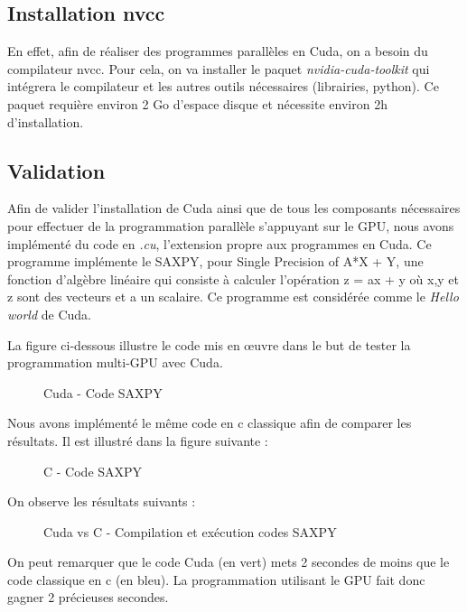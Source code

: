 \documentclass[final]{polytech/polytech}
\begin{document}
\subsection{Installation nvcc}
En effet, afin de réaliser des programmes parallèles en Cuda, on a besoin du compilateur nvcc. Pour cela, on va installer le paquet \textit{nvidia-cuda-toolkit} qui intégrera le compilateur et les autres outils nécessaires (librairies, python). Ce paquet requière environ 2 Go d'espace disque et nécessite environ 2h d'installation.

\subsection{Validation}
Afin de valider l'installation de Cuda ainsi que de tous les composants nécessaires pour effectuer de la programmation parallèle s'appuyant sur le GPU, nous avons implémenté du code en \textit{.cu}, l'extension propre aux programmes en Cuda. Ce programme implémente le SAXPY, pour Single Precision of A*X + Y, une fonction d'algèbre linéaire qui consiste à calculer l'opération z = ax + y où x,y et z sont des vecteurs et a un scalaire. Ce programme est considérée comme le \textit{Hello world} de Cuda.

La figure ci-dessous illustre le code mis en œuvre dans le but de tester la programmation multi-GPU avec Cuda.

\begin{figure}
	\caption{Cuda - Code SAXPY}
	\label{fig:cuda_saxpy_code}
\end{figure}

\vfill\eject

Nous avons implémenté le même code en c classique afin de comparer les résultats. Il est illustré dans la figure suivante :

\begin{figure}
\caption{C - Code SAXPY}
\label{fig:c_saxpy_code}
\end{figure}

On observe les résultats suivants :

\begin{figure}
\caption{Cuda vs C - Compilation et exécution codes SAXPY}
\label{fig:cuda_vs_c_saxpy}
\end{figure}

On peut remarquer que le code Cuda (en vert) mets 2 secondes de moins que le code classique en c (en bleu). La programmation utilisant le GPU fait donc gagner 2 précieuses secondes.
\end{document}
